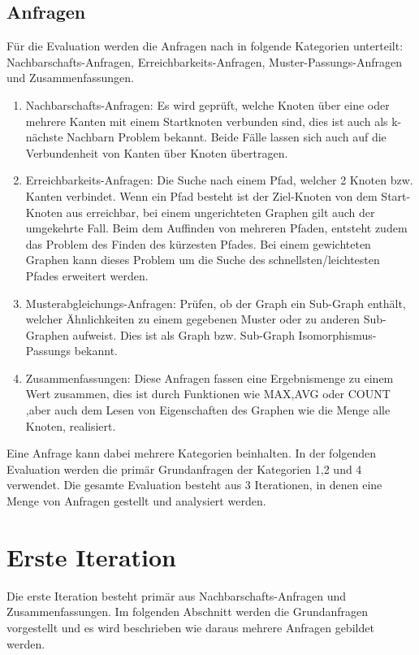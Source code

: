 \subsection{Anfragen}
Für die Evaluation werden die Anfragen nach  \parencite{angles2012comparison}  in folgende Kategorien unterteilt: Nachbarschafts-Anfragen, Erreichbarkeits-Anfragen, Muster-Passungs-Anfragen und  Zusammenfassungen. 
\begin{enumerate}
	\item Nachbarschafts-Anfragen: Es wird geprüft, welche Knoten über eine oder mehrere Kanten mit einem Startknoten verbunden sind, dies ist auch als k-nächste Nachbarn Problem bekannt. Beide Fälle lassen sich auch auf die Verbundenheit von Kanten über Knoten übertragen.
	\item Erreichbarkeits-Anfragen: Die Suche nach einem Pfad, welcher 2 Knoten bzw. Kanten verbindet. Wenn ein Pfad besteht ist der Ziel-Knoten von dem Start-Knoten aus erreichbar, bei einem ungerichteten Graphen gilt auch der umgekehrte Fall. Beim dem Auffinden von mehreren Pfaden, entsteht zudem das Problem des Finden des kürzesten Pfades. Bei einem gewichteten Graphen kann dieses Problem um die Suche des schnellsten/leichtesten Pfades  erweitert werden. 
	\item Musterabgleichungs-Anfragen: Prüfen, ob der Graph ein Sub-Graph enthält, welcher Ähnlichkeiten zu einem gegebenen Muster oder zu anderen Sub-Graphen aufweist. Dies ist als Graph bzw. Sub-Graph Isomorphismus-Passungs bekannt. 
	\item Zusammenfassungen: Diese Anfragen fassen eine Ergebnismenge zu einem Wert zusammen, dies ist durch Funktionen wie MAX,AVG oder COUNT ,aber auch dem Lesen von Eigenschaften des Graphen wie die Menge alle Knoten, realisiert. 
\end{enumerate}
Eine Anfrage kann dabei mehrere Kategorien beinhalten. In der folgenden Evaluation werden die primär Grundanfragen der Kategorien 1,2 und 4 verwendet. Die gesamte Evaluation besteht aus 3 Iterationen, in denen eine Menge von Anfragen gestellt und analysiert werden. 
\section{Erste Iteration}
Die erste Iteration besteht primär aus Nachbarschafts-Anfragen und Zusammenfassungen. Im folgenden Abschnitt werden die Grundanfragen vorgestellt und es wird beschrieben wie daraus mehrere Anfragen gebildet werden. 
